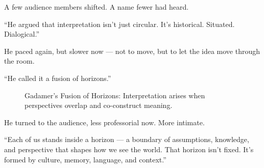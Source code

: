 A few audience members shifted. A name fewer had heard.

``He argued that interpretation isn’t just circular. It’s historical. Situated. Dialogical.''

He paced again, but slower now — not to move, but to let the idea move through the room.

``He called it a fusion of horizons.''

\medskip

\begin{figure}[H]
  \centering
  \caption{Gadamer’s Fusion of Horizons: Interpretation arises when perspectives overlap and co-construct meaning.}
\end{figure}


\medskip

He turned to the audience, less professorial now. More intimate.

``Each of us stands inside a horizon — a boundary of assumptions, knowledge, and perspective that shapes how we see the world. That horizon isn’t fixed. It’s formed by culture, memory, language, and context.''

